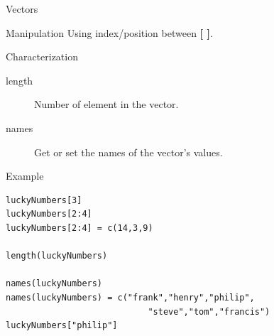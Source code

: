 \documentclass[10pt]{beamer}
\begin{document}

\begin{frame}[fragile,shrink=5]{Vectors}
  \begin{block}{Manipulation}
    Using index/position between {\bf [ ]}.
  \end{block}
  \begin{block}{Characterization}
    \begin{description}
    \item[length] Number of element in the {\sf vector}.
    \item[names] Get or set the names of the {\sf vector}'s values.
    \end{description}
  \end{block}
  \begin{exampleblock}{Example}
\begin{verbatim}
luckyNumbers[3]
luckyNumbers[2:4]
luckyNumbers[2:4] = c(14,3,9)

length(luckyNumbers)

names(luckyNumbers)
names(luckyNumbers) = c("frank","henry","philip",
                            "steve","tom","francis") 
luckyNumbers["philip"]
\end{verbatim}
  \end{exampleblock}
\end{frame}

\end{document}
